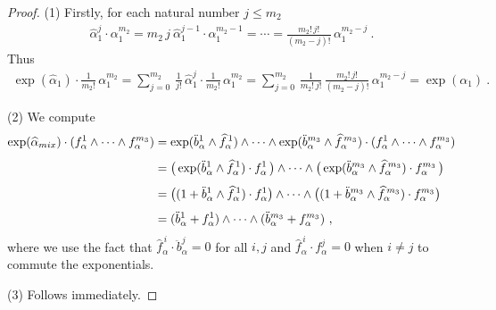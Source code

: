\documentclass[10pt,a4paper]{amsart}
\begin{document}
\begin{proof}
    (1) Firstly, for each natural number $j\leqslant m_2$
    \begin{align}
        \widehat \alpha_1^j \cdot \alpha_1^{m_2} = m_2\, j\ \widehat\alpha_1^{j-1} \cdot \alpha_1^{m_2-1} = \cdots = \frac{m_2!\, j!}{(m_2-j)!}\,\alpha_1^{m_2-j} \ .
    \end{align}
    Thus
    \begin{equation}
    \begin{aligned}
        \exp(\widehat \alpha_1) \cdot \frac{1}{m_2!}\, \alpha_1^{m_2} = \sum_{j=0}^{m_2}\,\frac1{j!}\,\widehat\alpha_1^j  \cdot \frac{1}{m_2!}\, \alpha_1^{m_2}=\sum_{j=0}^{m_2}\, \frac{1}{m_2!\,j!}\, \frac{m_2!\, j!}{(m_2-j)!}\, \alpha_1^{m_2-j} = \exp( \alpha_1)\ .
    \end{aligned}
    \end{equation}
    
    \noindent (2) We compute
    \begin{equation}
    \begin{aligned}
        \exp(\widehat \alpha_{\rm mix}) \cdot ( f_\alpha^1 \wedge \cdots \wedge f_\alpha^{m_3}) &= \exp(\ddot b_\alpha^1 \wedge \widehat f_\alpha^{\,1} ) \wedge \cdots \wedge \exp(\ddot b_\alpha^{m_3} \wedge \widehat f_\alpha^{\,m_3} ) \cdot ( f_\alpha^1 \wedge \cdots \wedge f_\alpha^{m_3})\\[4pt]
        &=\big(\exp(\ddot b_\alpha^1 \wedge \widehat f_\alpha^{\,1} ) \cdot f_\alpha^1\,\big) \wedge \cdots \wedge \big(\exp(\ddot b_\alpha^{m_3} \wedge \widehat f_\alpha^{\,m_3} )\cdot f_\alpha^{m_3}\,\big) \\[4pt]
        &=\big((1+\ddot b_\alpha^1 \wedge \widehat f_\alpha^{\,1} ) \cdot f_\alpha^1 \big)\wedge \cdots \wedge \big((1+\ddot b_\alpha^{m_3} \wedge \widehat f_\alpha^{\,m_3} )\cdot f_\alpha^{m_3}\big)\\[4pt]
        &=(\ddot b_\alpha^1 + f_\alpha^1) \wedge \cdots \wedge (\ddot b_\alpha^{m_3} + f_\alpha^{m_3}) \ ,
    \end{aligned}
    \end{equation}
    where we use the fact that $\widehat f_\alpha^{\,i} \cdot \ddot b_\alpha^j = 0$ for all $i,j$ and $\widehat f_\alpha^{\,i} \cdot f_\alpha^j = 0$ when $i\neq j$ to commute the exponentials.

    \noindent (3) Follows immediately.


\end{proof}
\end{document}

